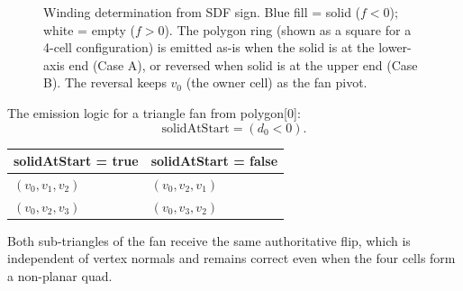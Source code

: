 \documentclass[10pt,a4paper]{article}
\begin{document}
\begin{figure}[htb]
\caption{Winding determination from SDF sign.  Blue fill = solid ($f<0$);
white = empty ($f>0$).  The polygon ring (shown as a square for a 4-cell
configuration) is emitted as-is when the solid is at the lower-axis
end (Case A), or reversed when solid is at the upper end (Case B).
The reversal keeps $v_0$ (the owner cell) as the fan pivot.}
\label{fig:winding}
\end{figure}

The emission logic for a triangle fan from polygon[0]:
\[
  \text{solidAtStart} = (d_0 < 0).
\]
\begin{center}
\begin{tabular}{ll}
  \toprule
  \multicolumn{1}{c}{solidAtStart = true} &
  \multicolumn{1}{c}{solidAtStart = false}\\
  \midrule
  $(v_0, v_1, v_2)$ & $(v_0, v_2, v_1)$ \\
  $(v_0, v_2, v_3)$ & $(v_0, v_3, v_2)$ \\
  \bottomrule
\end{tabular}
\end{center}
Both sub-triangles of the fan receive the same authoritative flip, which
is independent of vertex normals and remains correct even when the four
cells form a non-planar quad.
\end{document}
